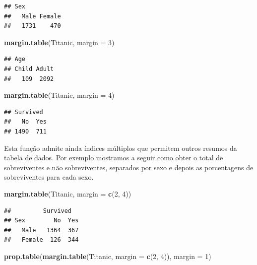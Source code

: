 \documentclass[]{book}
\newenvironment{Shaded}{\begin{snugshade}}{\end{snugshade}}
\newcommand{\DataTypeTok}[1]{\textcolor[rgb]{0.13,0.29,0.53}{#1}}
\newcommand{\DecValTok}[1]{\textcolor[rgb]{0.00,0.00,0.81}{#1}}
\newcommand{\KeywordTok}[1]{\textcolor[rgb]{0.13,0.29,0.53}{\textbf{#1}}}
\newcommand{\NormalTok}[1]{#1}
\begin{document}
\begin{verbatim}
## Sex
##   Male Female 
##   1731    470
\end{verbatim}

\begin{Shaded}
\begin{Highlighting}[]
\KeywordTok{margin.table}\NormalTok{(Titanic, }\DataTypeTok{margin =} \DecValTok{3}\NormalTok{)}
\end{Highlighting}
\end{Shaded}

\begin{verbatim}
## Age
## Child Adult 
##   109  2092
\end{verbatim}

\begin{Shaded}
\begin{Highlighting}[]
\KeywordTok{margin.table}\NormalTok{(Titanic, }\DataTypeTok{margin =} \DecValTok{4}\NormalTok{)}
\end{Highlighting}
\end{Shaded}

\begin{verbatim}
## Survived
##   No  Yes 
## 1490  711
\end{verbatim}

Esta função admite ainda índices múltiplos que permitem outros resumos da tabela de dados. Por exemplo mostramos a seguir como obter o total de sobreviventes e não sobreviventes, separados por sexo e depois as porcentagens de sobreviventes para cada sexo.

\begin{Shaded}
\begin{Highlighting}[]
\KeywordTok{margin.table}\NormalTok{(Titanic, }\DataTypeTok{margin =} \KeywordTok{c}\NormalTok{(}\DecValTok{2}\NormalTok{, }\DecValTok{4}\NormalTok{))}
\end{Highlighting}
\end{Shaded}

\begin{verbatim}
##         Survived
## Sex        No  Yes
##   Male   1364  367
##   Female  126  344
\end{verbatim}

\begin{Shaded}
\begin{Highlighting}[]
\KeywordTok{prop.table}\NormalTok{(}\KeywordTok{margin.table}\NormalTok{(Titanic, }\DataTypeTok{margin =} \KeywordTok{c}\NormalTok{(}\DecValTok{2}\NormalTok{, }\DecValTok{4}\NormalTok{)), }\DataTypeTok{margin =} \DecValTok{1}\NormalTok{)}
\end{Highlighting}
\end{Shaded}
\end{document}
